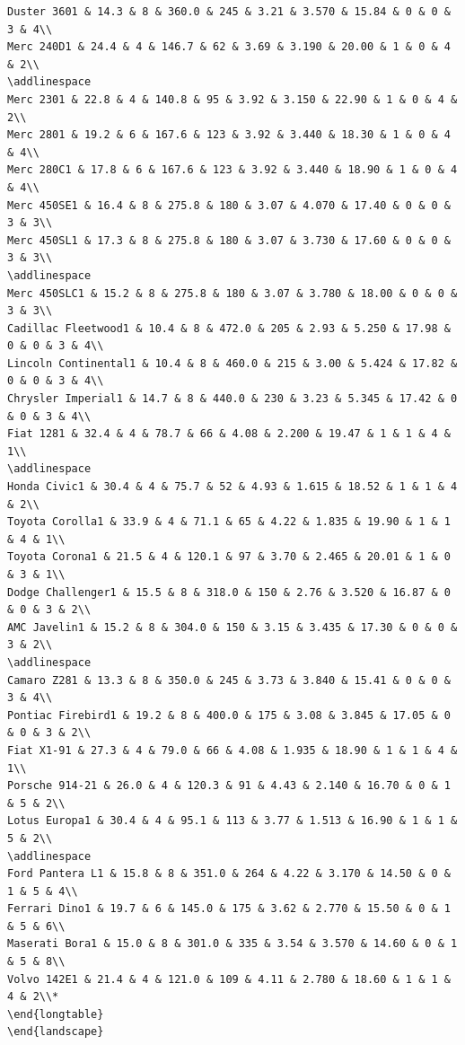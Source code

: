 \documentclass[a4paper, nobind]{templates/ociamthesis}
\begin{document}
\begin{verbatim}
Duster 3601 & 14.3 & 8 & 360.0 & 245 & 3.21 & 3.570 & 15.84 & 0 & 0 & 3 & 4\\
Merc 240D1 & 24.4 & 4 & 146.7 & 62 & 3.69 & 3.190 & 20.00 & 1 & 0 & 4 & 2\\
\addlinespace
Merc 2301 & 22.8 & 4 & 140.8 & 95 & 3.92 & 3.150 & 22.90 & 1 & 0 & 4 & 2\\
Merc 2801 & 19.2 & 6 & 167.6 & 123 & 3.92 & 3.440 & 18.30 & 1 & 0 & 4 & 4\\
Merc 280C1 & 17.8 & 6 & 167.6 & 123 & 3.92 & 3.440 & 18.90 & 1 & 0 & 4 & 4\\
Merc 450SE1 & 16.4 & 8 & 275.8 & 180 & 3.07 & 4.070 & 17.40 & 0 & 0 & 3 & 3\\
Merc 450SL1 & 17.3 & 8 & 275.8 & 180 & 3.07 & 3.730 & 17.60 & 0 & 0 & 3 & 3\\
\addlinespace
Merc 450SLC1 & 15.2 & 8 & 275.8 & 180 & 3.07 & 3.780 & 18.00 & 0 & 0 & 3 & 3\\
Cadillac Fleetwood1 & 10.4 & 8 & 472.0 & 205 & 2.93 & 5.250 & 17.98 & 0 & 0 & 3 & 4\\
Lincoln Continental1 & 10.4 & 8 & 460.0 & 215 & 3.00 & 5.424 & 17.82 & 0 & 0 & 3 & 4\\
Chrysler Imperial1 & 14.7 & 8 & 440.0 & 230 & 3.23 & 5.345 & 17.42 & 0 & 0 & 3 & 4\\
Fiat 1281 & 32.4 & 4 & 78.7 & 66 & 4.08 & 2.200 & 19.47 & 1 & 1 & 4 & 1\\
\addlinespace
Honda Civic1 & 30.4 & 4 & 75.7 & 52 & 4.93 & 1.615 & 18.52 & 1 & 1 & 4 & 2\\
Toyota Corolla1 & 33.9 & 4 & 71.1 & 65 & 4.22 & 1.835 & 19.90 & 1 & 1 & 4 & 1\\
Toyota Corona1 & 21.5 & 4 & 120.1 & 97 & 3.70 & 2.465 & 20.01 & 1 & 0 & 3 & 1\\
Dodge Challenger1 & 15.5 & 8 & 318.0 & 150 & 2.76 & 3.520 & 16.87 & 0 & 0 & 3 & 2\\
AMC Javelin1 & 15.2 & 8 & 304.0 & 150 & 3.15 & 3.435 & 17.30 & 0 & 0 & 3 & 2\\
\addlinespace
Camaro Z281 & 13.3 & 8 & 350.0 & 245 & 3.73 & 3.840 & 15.41 & 0 & 0 & 3 & 4\\
Pontiac Firebird1 & 19.2 & 8 & 400.0 & 175 & 3.08 & 3.845 & 17.05 & 0 & 0 & 3 & 2\\
Fiat X1-91 & 27.3 & 4 & 79.0 & 66 & 4.08 & 1.935 & 18.90 & 1 & 1 & 4 & 1\\
Porsche 914-21 & 26.0 & 4 & 120.3 & 91 & 4.43 & 2.140 & 16.70 & 0 & 1 & 5 & 2\\
Lotus Europa1 & 30.4 & 4 & 95.1 & 113 & 3.77 & 1.513 & 16.90 & 1 & 1 & 5 & 2\\
\addlinespace
Ford Pantera L1 & 15.8 & 8 & 351.0 & 264 & 4.22 & 3.170 & 14.50 & 0 & 1 & 5 & 4\\
Ferrari Dino1 & 19.7 & 6 & 145.0 & 175 & 3.62 & 2.770 & 15.50 & 0 & 1 & 5 & 6\\
Maserati Bora1 & 15.0 & 8 & 301.0 & 335 & 3.54 & 3.570 & 14.60 & 0 & 1 & 5 & 8\\
Volvo 142E1 & 21.4 & 4 & 121.0 & 109 & 4.11 & 2.780 & 18.60 & 1 & 1 & 4 & 2\\*
\end{longtable}
\end{landscape}


\end{verbatim}
\end{document}

